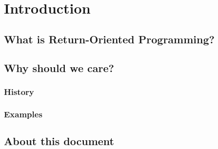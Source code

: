 \section{Introduction}
\subsection{What is Return-Oriented Programming?}



\subsection{Why should we care?}
\subsubsection{History}

\subsubsection{Examples}



\subsection{About this document}

